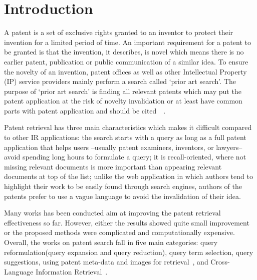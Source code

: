 \documentclass{sig-alternate}
\begin{document}
\section{Introduction}
A patent is a set of exclusive rights granted to an inventor to protect their invention for a limited period of time. An important requirement for a patent to be granted is that the invention, it describes, is novel which means there is no earlier patent, publication or public communication of a similar idea. To ensure the novelty of an invention, patent offices as well as other Intellectual Property (IP) service providers mainly perform a search called `prior art search'. The purpose of `prior art search' is finding all relevant patents which may put the patent application at the risk of novelty invalidation or at least have common parts with patent application and should be cited~\cite{magdy2012toward}~\cite{piroi2013overview}. 

Patent retrieval has three main characteristics which makes it difficult compared to other IR applications: the search starts with a query as long as a full patent application that helps users --usually patent examiners, inventors, or lawyers-- avoid spending long hours to formulate a query; it is recall-oriented, where not missing relevant documents is more important than appearing relevant documents at top of the list; unlike the web application in which authors tend to highlight their work to be easily found through search engines, authors of the patents prefer to use a vague language to avoid the invalidation of their idea.     

Many works has been conducted aim at improving the patent retrieval effectiveness so far. However, either the results showed quite small improvement or the proposed methods were complicated and computationally expensive. Overall, the works on patent search fall in five main categories: query reformulation(query expansion and query reduction), query term selection, query suggestions, using patent meta-data and images for retrieval~\cite{lupu2013evaluating}, and Cross-Language Information Retrieval~\cite{magdy2014studying}.
\end{document}
